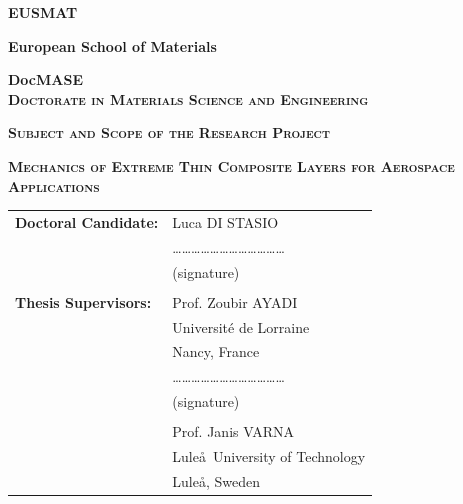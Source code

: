 \documentclass
[
a4paper,                      %
twoside,					  %
12pt,                         %
abstract,		      %
fleqn,                        %
]
{scrartcl} %
\begin{document}
\begin{center}

\vspace*{0.1cm}

\begin{Large}
\textbf{\textsc{EUSMAT}}\\[0.75ex]
\end{Large}

\begin{large}
\textbf{European School of Materials}\\[0.75ex]

\vspace*{0.75cm}

\textbf{DocMASE}\\[0.75ex]
\textbf{\textsc{Doctorate in Materials Science and Engineering}}
\end{large}

\vspace{1.5cm}

\begin{Large}
\textbf{\textsc{Subject and Scope of the Research Project}}\\[0.75ex]
\end{Large}
\vspace*{0.5cm}

\begin{LARGE}
\textbf{\textsc{Mechanics of Extreme Thin Composite Layers for Aerospace Applications}}\\[0.75ex]
\end{LARGE}
\vspace*{2cm}

\begin{flushright}
\begin{tabular}{l l }
{\large \textbf{Doctoral Candidate:}} & {\large Luca DI STASIO}\\[10pt]
&\dots\dots\dots\dots\dots\dots\dots\dots\dots\dots\dots\dots\\
&{\scriptsize (signature)}\\
&\\
{\large \textbf{Thesis Supervisors:}}& {\large Prof. Zoubir AYADI}\\
&{\large Universit\'e de Lorraine}\\
&{\large Nancy, France}\\[10pt]
&\dots\dots\dots\dots\dots\dots\dots\dots\dots\dots\dots\dots\\
&{\scriptsize (signature)}\\
&\\
& {\large Prof. Janis VARNA}\\
&{\large Lule\aa\ University of Technology}\\
&{\large Lule\aa, Sweden}\\
\end{tabular}
\end{flushright}


\end{center}
\end{document}
